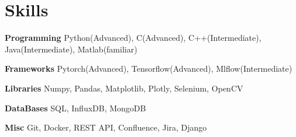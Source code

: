 
\section{Skills}
  \vspace{2pt}
  \resumeSubHeadingListStart
    \small{\item{

    \textbf{\color{MidnightBlue}Programming}{ Python(Advanced), C(Advanced), C++(Intermediate), Java(Intermediate), Matlab(familiar)} \\ \vspace{3pt}

    \textbf{\color{MidnightBlue}Frameworks}{ Pytorch(Advanced), Tensorflow(Advanced), Mlflow(Intermediate)} \\ \vspace{3pt}

    \textbf{\color{MidnightBlue}Libraries}{ Numpy, Pandas, Matplotlib, Plotly, Selenium, OpenCV} \\ \vspace{3pt}


    \textbf{\color{MidnightBlue}DataBases}{ SQL, InfluxDB, MongoDB} \\ \vspace{3pt}

    \textbf{\color{MidnightBlue}Misc}{ Git, Docker, REST API, Confluence, Jira, Django} \\ \vspace{3pt}
            
    }}
  \resumeSubHeadingListEnd
